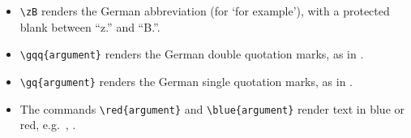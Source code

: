 \begin{itemize}
	\item \verb|\zB| renders the German abbreviation \zB (for `for example'), with a protected blank between ``z.'' and ``B.''.
	
	\item \verb||  renders the German double quotation marks, as in \gqq{argument}.
	
	\item \verb||  renders the German single quotation marks, as in \gq{argument}.
	
	\item The commands \verb|\red{argument}| and \verb|\blue{argument}| render text in blue or red, e.g.\ , .
\end{itemize}








